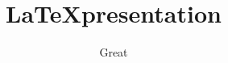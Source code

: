 \documentclass{beamer}
\title{\LaTeX presentation }
\author{Great}
\begin{document}
            \frame{\titlepage}
            \section{}
        
\end{document}
